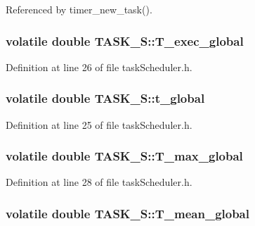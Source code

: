 Referenced by timer\-\_\-new\-\_\-task().

\hypertarget{structTASK__S_ae06b712fd9963cff8192e9ef3140bc6d}{
\subsubsection[{T\-\_\-exec\-\_\-global}]{\setlength{\rightskip}{0pt plus 5cm}volatile double T\-A\-S\-K\-\_\-\-S\-::\-T\-\_\-exec\-\_\-global}}\label{structTASK__S_ae06b712fd9963cff8192e9ef3140bc6d}


Definition at line 26 of file task\-Scheduler.\-h.

\hypertarget{structTASK__S_a29a175bdd4b9f880a2b69bb5186e3c7e}{
\subsubsection[{t\-\_\-global}]{\setlength{\rightskip}{0pt plus 5cm}volatile double T\-A\-S\-K\-\_\-\-S\-::t\-\_\-global}}\label{structTASK__S_a29a175bdd4b9f880a2b69bb5186e3c7e}


Definition at line 25 of file task\-Scheduler.\-h.

\hypertarget{structTASK__S_a430c874cbf361b6dbc75ad1540880948}{
\subsubsection[{T\-\_\-max\-\_\-global}]{\setlength{\rightskip}{0pt plus 5cm}volatile double T\-A\-S\-K\-\_\-\-S\-::\-T\-\_\-max\-\_\-global}}\label{structTASK__S_a430c874cbf361b6dbc75ad1540880948}


Definition at line 28 of file task\-Scheduler.\-h.

\hypertarget{structTASK__S_a9ebae87e1b64869f328a47473f2ea7d7}{
\subsubsection[{T\-\_\-mean\-\_\-global}]{\setlength{\rightskip}{0pt plus 5cm}volatile double T\-A\-S\-K\-\_\-\-S\-::\-T\-\_\-mean\-\_\-global}}\label{structTASK__S_a9ebae87e1b64869f328a47473f2ea7d7}


